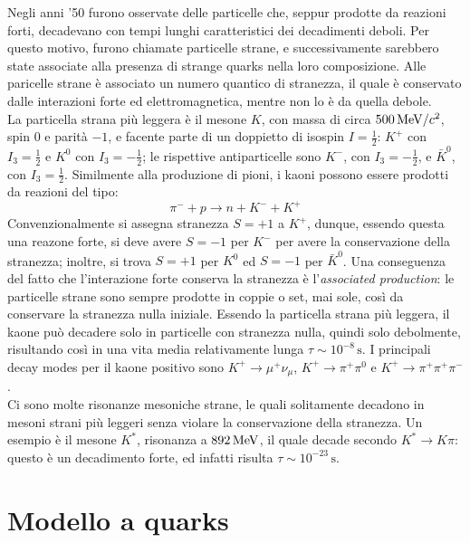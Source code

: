 Negli anni '50 furono osservate delle particelle che, seppur prodotte da reazioni forti, decadevano con tempi lunghi caratteristici dei decadimenti deboli. Per questo motivo, furono chiamate particelle strane, e successivamente sarebbero state associate alla presenza di strange quarks nella loro composizione.
Alle paricelle strane è associato un numero quantico di stranezza, il quale è conservato dalle interazioni forte ed elettromagnetica, mentre non lo è da quella debole.\\
La particella strana più leggera è il mesone $ K $, con massa di circa $ 500\,\mathrm{MeV}/c^2 $, spin 0 e parità $ -1 $, e facente parte di un doppietto di isospin $ I = \frac{1}{2} $: $ K^+ $ con $ I_3 = \frac{1}{2} $ e $ K^0 $ con $ I_3 = -\frac{1}{2} $; le rispettive antiparticelle sono $ K^- $, con $ I_3 = -\frac{1}{2} $, e $ \bar{K}^0 $, con $ I_3 = \frac{1}{2} $. Similmente alla produzione di pioni, i kaoni possono essere prodotti da reazioni del tipo:
\begin{equation*}
	\pi^- + p \rightarrow n + K^- + K^+
\end{equation*}
Convenzionalmente si assegna stranezza $ S = +1 $ a $ K^+ $, dunque, essendo questa una reazone forte, si deve avere $ S = -1 $ per $ K^- $ per avere la conservazione della stranezza; inoltre, si trova $ S = +1 $ per $ K^0 $ ed $ S = -1 $ per $ \bar{K}^0 $. Una conseguenza del fatto che l'interazione forte conserva la stranezza è l'\textit{associated production}: le particelle strane sono sempre prodotte in coppie o set, mai sole, così da conservare la stranezza nulla iniziale. Essendo la particella strana più leggera, il kaone può decadere solo in particelle con stranezza nulla, quindi solo debolmente, risultando così in una vita media relativamente lunga $ \tau \sim 10^{-8}\,\text{s} $. I principali decay modes per il kaone positivo sono $ K^+ \rightarrow \mu^+ \nu_{\mu} $, $ K^+ \rightarrow \pi^+ \pi^0 $ e $ K^+ \rightarrow \pi^+ \pi^+ \pi^- $.\\
Ci sono molte risonanze mesoniche strane, le quali solitamente decadono in mesoni strani più leggeri senza violare la conservazione della stranezza. Un esempio è il mesone $ K^* $, risonanza a $ 892\,\mathrm{MeV} $, il quale decade secondo $ K^* \rightarrow K \pi $: questo è un decadimento forte, ed infatti risulta $ \tau \sim 10^{-23}\,\text{s} $.

\section{Modello a quarks}

